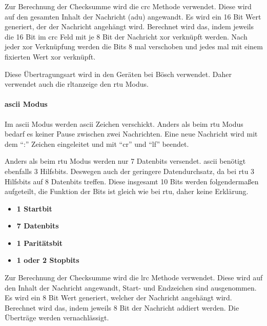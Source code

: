 Zur Berechnung der Checksumme wird die \acf{crc} Methode verwendet. Diese wird auf den gesamten Inhalt der Nachricht (\acs{adu}) angewandt. Es wird ein 16 Bit Wert generiert, der der Nachricht angehängt wird. Berechnet wird das, indem jeweils die 16 Bit im \acs{crc} Feld mit je 8 Bit der Nachricht \gls{xor} verknüpft werden. Nach jeder \gls{xor} Verknüpfung werden die Bits 8 mal verschoben und jedes mal mit einem fixierten Wert \gls{xor} verknüpft. 

Diese Übertragungsart wird in den Geräten bei Bösch verwendet. Daher verwendet auch die \acs{rltanzeige} den \acs{rtu} Modus.

\paragraph{\acs{ascii} Modus}
Im \acs{ascii} Modus werden \acs{ascii} Zeichen verschickt. Anders als beim \acs{rtu} Modus bedarf es keiner Pause zwischen zwei Nachrichten. Eine neue Nachricht wird mit dem \enquote{:} Zeichen eingeleitet und mit \enquote{\gls{cr}} und \enquote{\gls{lf}} beendet.

Anders als beim \acs{rtu} Modus werden nur 7 Datenbits versendet. \acs{ascii} benötigt ebenfalls 3 Hilfsbits. Deswegen auch der geringere Datendurchsatz, da bei \acs{rtu} 3 Hilfsbits auf 8 Datenbits treffen. Diese insgesamt 10 Bits werden folgendermaßen aufgeteilt, die Funktion der Bits ist gleich wie bei \acs{rtu}, daher keine Erklärung.
\begin{itemize}
	\item \textbf{1 Startbit}
	\item \textbf{7 Datenbits}
	\item \textbf{1 Paritätsbit}
	\item \textbf{1 oder 2 Stopbits}
\end{itemize}

Zur Berechnung der Checksumme wird die \acf{lrc} Methode verwendet. Diese wird auf den Inhalt der Nachricht angewandt, Start- und Endzeichen sind ausgenommen. Es wird ein 8 Bit Wert generiert, welcher der Nachricht angehängt wird. Berechnet wird das, indem jeweils 8 Bit der Nachricht addiert werden. Die Überträge werden vernachlässigt.

